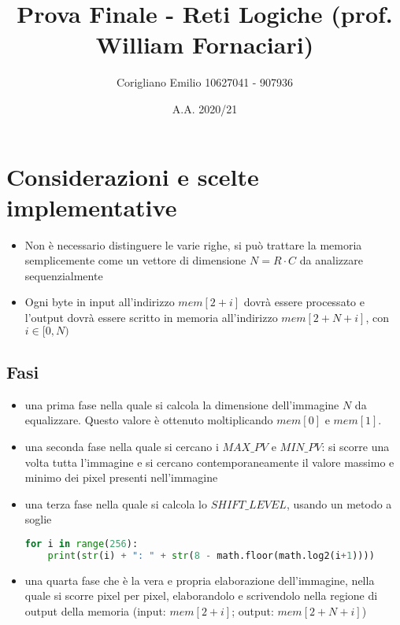 \documentclass[11pt]{article} %
\title{Prova Finale - Reti Logiche (prof. William Fornaciari)}
\author{Corigliano Emilio 10627041 - 907936}
\date{A.A. 2020/21} %
\begin{document}
\maketitle

\section{Considerazioni e scelte implementative}

\begin{itemize}
\item Non è necessario distinguere le varie righe, si può trattare la memoria semplicemente come un vettore di dimensione $N = R \cdot C$ da analizzare sequenzialmente

\item Ogni byte in input all'indirizzo $mem[2+i]$ dovrà essere processato e l'output dovrà essere scritto in memoria all'indirizzo $mem[2+ N +i]$, con $i \in [0, N)$
\end{itemize}

\subsection{Fasi}
\begin{itemize}
\item una prima fase nella quale si calcola la dimensione dell'immagine $N$ da equalizzare. Questo valore è ottenuto moltiplicando $mem[0]$ e $mem[1]$.
\item una seconda fase nella quale si cercano i $MAX\_PV$ e $MIN\_PV$: si scorre una volta tutta l'immagine e si cercano contemporaneamente il valore massimo e minimo dei pixel presenti nell'immagine
\item una terza fase nella quale si calcola lo $SHIFT\_LEVEL$, usando un metodo a soglie
	\begin{lstlisting}[language=Python, caption=Generazione di soglie]
for i in range(256):
	print(str(i) + ": " + str(8 - math.floor(math.log2(i+1))))
	\end{lstlisting}
\item una quarta fase che è la vera e propria elaborazione dell'immagine, nella quale si scorre pixel per pixel, elaborandolo e scrivendolo nella regione di output della memoria (input: $mem[2+i]$; output: $mem[2+N+i]$)
\end{itemize}
 
\end{document}
